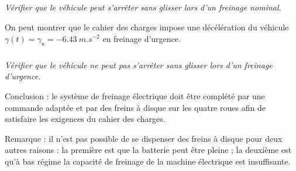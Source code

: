 \documentclass[10pt,fleqn]{article} %
\begin{document}
\begin{multicols}{2}
\subparagraph{}\textit{Vérifier que le véhicule peut s’arrêter sans glisser lors d’un freinage nominal.}
\ifprof
\begin{corrige}
\end{corrige}
\else
\fi

On peut montrer que le cahier des charges impose une décélération du véhicule $\gamma(t) = \gamma_u = -\SI{6,43}{m.s^{-2}}$ en freinage d’urgence.

\subparagraph{}\textit{Vérifier que le véhicule ne peut pas s’arrêter sans glisser lors d’un freinage d’urgence.}
\ifprof
\begin{corrige}
\end{corrige}
\else
\fi

Conclusion : le système de freinage électrique doit être complété par une commande adaptée et par des freins
à disque sur les quatre roues afin de satisfaire les exigences du cahier des charges.

Remarque : il n’est pas possible de se dispenser des freins à disque pour deux autres raisons : la première est
que la batterie peut être pleine ; la deuxième est qu’à bas régime la capacité de freinage de la machine électrique
est insuffisante.
\ifprof
\else
\end{multicols}
\fi
\end{document}
